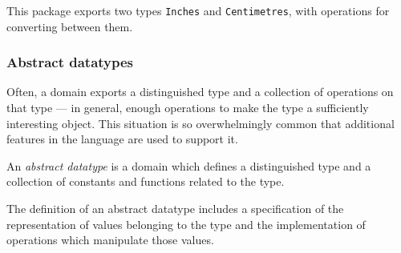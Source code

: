 This package exports two types \verb"Inches" and \verb"Centimetres",
with operations for converting between them.

\subsubsection{Abstract datatypes}

Often, a domain exports a distinguished type and a collection of
operations on that type --- in general, enough operations to make the
type a sufficiently interesting object.  This situation is so
overwhelmingly common that additional features in the language are used
to support it.

An {\em abstract datatype} is a domain which defines a distinguished
type and a collection of constants and functions related to the type.

The definition of an abstract datatype
includes a specification of the representation of values
belonging to the type and the implementation of operations which
manipulate those values.

